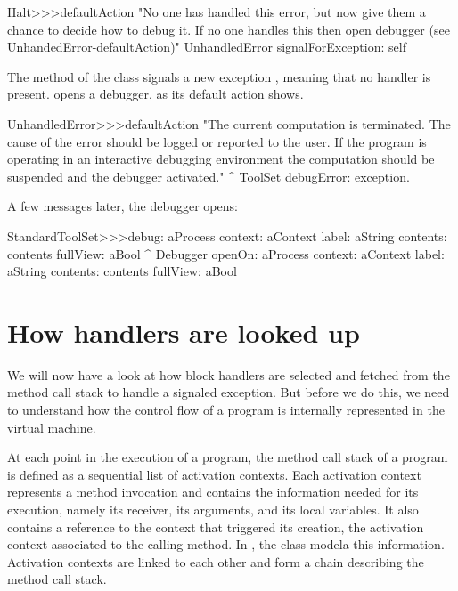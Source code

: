 \documentclass[a4paper,10pt,twoside]{book}
\begin{document}
\begin{code}{}
Halt>>>defaultAction
	"No one has handled this error, but now give them a chance to decide
	how to debug it.  If no one handles this then open debugger
	(see UnhandedError-defaultAction)"
	UnhandledError signalForException: self
\end{code}

The method   of the  class signals a new exception , meaning that no handler is present.  opens a debugger, as its default action shows.

\begin{code}{}
UnhandledError>>>defaultAction
	"The current computation is terminated. The cause of the error should be logged or reported to the user. If the program is operating in an interactive debugging environment the computation should be suspended and the debugger activated."
	^ ToolSet debugError: exception.
\end{code}

A few messages later, the debugger opens:

\begin{code}{}
StandardToolSet>>>debug: aProcess context: aContext label: aString contents: contents fullView: aBool
	^ Debugger openOn: aProcess context: aContext label: aString contents: contents fullView: aBool
\end{code}

\section{How handlers are looked up}

We will now have a look at how block handlers are selected and fetched from the method call stack to handle a signaled exception. But before we do this, we need to understand how the control flow of a program is internally represented in the virtual machine.

At each point in the execution of a program, the method call stack of a program is defined as a sequential list of activation contexts. Each activation context represents a method invocation and contains the information needed for its execution, namely its receiver, its arguments, and its local variables. It also contains a reference to the context that triggered its creation, \ie the activation context associated to the calling method. In \pharo, the class  modela this information. Activation contexts are linked to each other and form a chain describing the method call stack.
\end{document}
